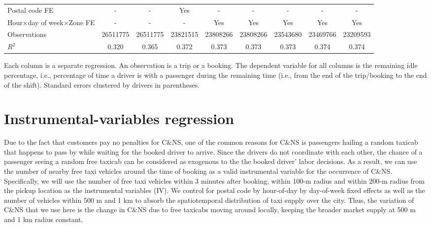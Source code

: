 \documentclass[reviewmode]{restat}
\begin{document}
\begin{appendices}
\begin{table}[h]
{\begin{tabular}{l*{8}{S}}
				\addlinespace
				Postal code FE      &         {-}         &         {-}         &       {Yes}         &         {-}         &         {-}         &         {-}         &         {-}         &         {-}         \\
				\addlinespace
				Hour\(\times\)day of week\(\times\)Zone FE&         {-}         &         {-}         &         {-}         &       {Yes}         &       {Yes}         &       {Yes}         &       {Yes}         &       {Yes}         \\
				\addlinespace
				Observations        &\num{26511775}         &\num{26511775}         &\num{23821515}         &\num{23808266}         &\num{23808266}         &\num{23543680}         &\num{23469766}         &\num{23209593}         \\
				$R^2$             &     {0.320}         &     {0.365}         &     {0.372}         &     {0.373}         &     {0.373}         &     {0.373}         &     {0.374}         &     {0.374}         \\
				\bottomrule
				\end{tabular}
				}
 			\begin{tablenotes}
 				Each column is a separate regression. An observation is a trip or a booking. The dependent variable for all columns is the remaining idle percentage, i.e., percentage of time a driver is with a passenger during the remaining time (i.e., from the end of the trip/booking to the end of the shift). Standard errors clustered by drivers in parentheses. 
 			\end{tablenotes}
 	\end{table}
\FloatBarrier

\section{Instrumental-variables regression}
\label{apx:iv}
Due to the fact that customers pay no penalties for C\&NS, one of the common reasons for C\&NS 
is passengers hailing a random taxicab that happens to pass by while waiting for the booked driver to arrive. 
Since the drivers do not coordinate with each other, the chance of a passenger seeing a random
free taxicab can be considered as exogenous to the the booked driver' labor decisions.
As a result, we can use the number of nearby free taxi vehicles around the time of 
booking as a valid instrumental variable for the occurrence of C\&NS.
Specifically, we will use the number of free taxi vehicles within 3 minutes after booking, 
within 100-m radius and within 200-m radius from the pickup location as the instrumental
variables (IV). We control for postal code by hour-of-day by day-of-week fixed effects as
well as the number of vehicles within 500 m and 1 km to absorb the spatiotemporal distribution
of taxi supply over the city. Thus, the variation of C\&NS that we use here is the change in C\&NS
due to free taxicabs moving around locally, keeping the broader market supply at 500 m and 1 km 
radius constant. 


\end{appendices}
\end{document}
